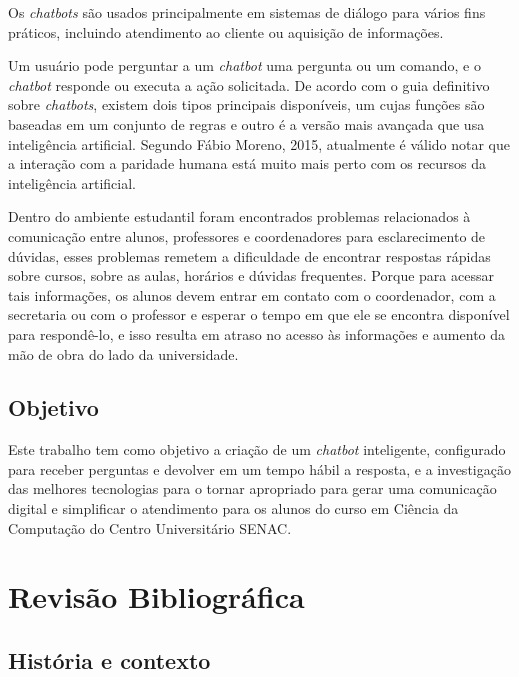 \documentclass[
	12pt,				%
	oneside,
	a4paper,			%
	english,			%
	french,				%
	spanish,			%
	brazil				%
	]{abntex2}
\begin{document}
Os \emph{chatbots} são usados principalmente em sistemas de diálogo para vários fins práticos, incluindo atendimento ao cliente ou aquisição de informações.
  
Um usuário pode perguntar a um \emph{chatbot} uma pergunta ou um comando, e o \emph{chatbot} responde ou executa a ação solicitada.  
De acordo com o guia definitivo sobre \emph{chatbots}, existem dois tipos principais disponíveis, um cujas funções são baseadas em um conjunto de regras e outro é a versão mais avançada que usa inteligência artificial. 
Segundo Fábio Moreno, 2015, atualmente é válido notar que a interação com a paridade humana está muito mais perto com os recursos da inteligência artificial.

Dentro do ambiente estudantil foram encontrados problemas relacionados à comunicação entre alunos, professores e coordenadores para esclarecimento de dúvidas, esses problemas remetem a dificuldade de encontrar respostas rápidas sobre cursos, sobre as aulas, horários e dúvidas frequentes. Porque para acessar tais informações, os alunos devem entrar em contato com o coordenador, com a secretaria ou com o professor e esperar o tempo em que ele se encontra disponível para respondê-lo, e isso resulta em atraso no acesso às informações e aumento da mão de obra do lado da universidade.  


\chapter{Objetivo}

Este trabalho tem como objetivo a criação de um \emph{chatbot} inteligente, configurado para receber perguntas e devolver em um tempo hábil a resposta, e a investigação das melhores tecnologias para o tornar apropriado para gerar uma comunicação digital e simplificar o atendimento para os alunos do curso em Ciência da Computação do Centro Universitário SENAC.


\part{Revisão Bibliográfica}



\chapter{História e contexto}
\label{cap_trabalho_academico}
\end{document}
